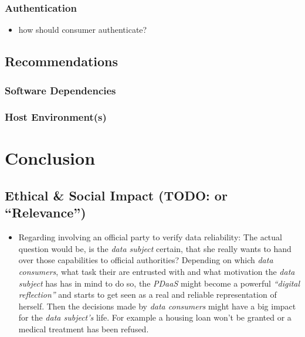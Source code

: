 \documentclass[12pt,english,a4paper,titlepage,cleardoublepage=empty,dottedtoc]{report}
\providecommand{\tightlist}{%
  \setlength{\itemsep}{0pt}\setlength{\parskip}{0pt}}
\begin{document}
\subsection{Authentication}\label{authentication-1}

\begin{itemize}
\tightlist
\item
  how should consumer authenticate?
\end{itemize}

\section{Recommendations}\label{recommendations}

\subsection{Software Dependencies}\label{software-dependencies}

\subsection{Host Environment(s)}\label{host-environments}

\chapter{Conclusion}\label{conclusion}

\section{\texorpdfstring{Ethical \& Social Impact (TODO: or
``Relevance'')}{Ethical \& Social Impact (TODO: or Relevance)}}\label{ethical-social-impact-todo-or-relevance}

\begin{itemize}
\tightlist
\item
  Regarding involving an official party to verify data reliability: The
  actual question would be, is the \emph{data subject} certain, that she
  really wants to hand over those capabilities to official authorities?
  Depending on which \emph{data consumers}, what task their are
  entrusted with and what motivation the \emph{data subject} has has in
  mind to do so, the \emph{PDaaS} might become a powerful
  \emph{``digital reflection''} and starts to get seen as a real and
  reliable representation of herself. Then the decisions made by
  \emph{data consumers} might have a big impact for the \emph{data
  subject's} life. For example a housing loan won't be granted or a
  medical treatment has been refused.
\end{itemize}
\end{document}

